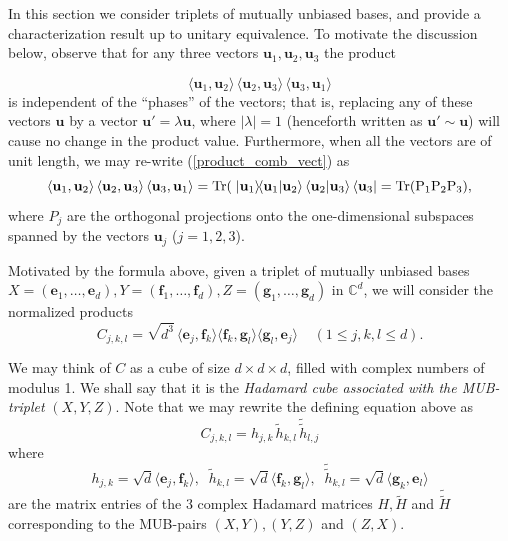 \documentclass[12pt]{amsart}
\numberwithin{equation}{section}
\theoremstyle{definition}
\theoremstyle{remark}
\theoremstyle{remark}
\newcommand{\Co}{\ensuremath{\mathbb{C}}}
\newcommand{\gb}{\ensuremath{\mathbf{g}}}
\newcommand{\eb}{\ensuremath{\mathbf{e}}}
\newcommand{\fb}{\ensuremath{\mathbf{f}}}
\newcommand{\ub}{\ensuremath{\mathbf{u}}}
\begin{document}
In this section we consider triplets of mutually unbiased bases, and provide a characterization result up to unitary equivalence. To motivate the discussion below, observe that for any three vectors $\ub_1,\ub_2,\ub_3$ the product 

\begin{equation}
\label{product_comb_vect}
\langle \ub_1, \ub_2\rangle \,
\langle \ub_2, \ub_3\rangle \,
\langle \ub_3, \ub_1\rangle     
\end{equation}
is independent of the ``phases'' of the vectors; that is, replacing any of these  vectors $\ub$ by a vector $\ub'=\lambda \ub$, where 
$|\lambda|=1$ (henceforth written as $\ub'\sim \ub$) will cause no change in the product value. Furthermore, 
when all the vectors are of unit length, we may re-write (\ref{product_comb_vect}) as
\begin{equation}
\label{product_comb_vect_tr}
\langle \ub_1, \ub_2\rangle \,
\langle \ub_2, \ub_3\rangle \,
\langle \ub_3, \ub_1\rangle =
\rm{Tr}(\;
|\ub_1\rangle\!\langle \ub_1|  \ub_2\rangle \,
\langle \ub_2 | \ub_3\rangle \,
\langle \ub_3 |  
  = {\rm Tr}(P_1P_2P_3),
\end{equation}
where $P_j$ are the orthogonal projections  
onto the one-dimensional subspaces spanned by the vectors $\ub_j$
($j=1,2,3$).

\medskip

Motivated by the formula above, given a triplet of mutually unbiased bases $X=(\eb_1, \dots, \eb_d), Y=(\fb_1, \dots, \fb_d), Z=(\gb_1, \dots, \gb_d)$ in $\Co^d$, we will consider the normalized products
\begin{equation}\label{hcube1}
C_{j,k,l}= \sqrt{d^3}\,
\langle \eb_j, \fb_k\rangle 
\langle \fb_k, \gb_l\rangle
\langle \gb_l, \eb_j\rangle \;\;\;\; (1\le j,k,l\le d).
\end{equation}

We may think of $C$ as a cube of size $d\times d\times d$, filled with complex numbers of modulus 1. We shall say that it is the  {\it Hadamard cube associated with the MUB-triplet} $(X, Y, Z)$. Note that we may rewrite the defining equation above as
$$
C_{j,k,l}= h_{j,k} \,\tilde{h}_{k,l}
\,\tilde{\tilde{h}}_{l,j}
$$
where
$$
h_{j,k} = {\sqrt{d}}
\langle \eb_j, \fb_k\rangle,\;\;
\tilde{h}_{k,l} =\sqrt{d}
\langle \fb_k, \gb_l\rangle,\;\;
\tilde{\tilde{h}}_{k,l} ={\sqrt{d}}
\langle \gb_k, \eb_l\rangle
$$
are the matrix entries of the $3$ complex Hadamard matrices $H,\tilde{H}$ and $\tilde{\tilde{H}}$ corresponding to the MUB-pairs $(X, Y), (Y, Z)$ and $(Z, X)$. 
\end{document}
